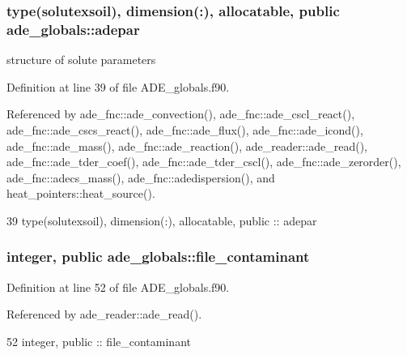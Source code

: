 \subsubsection[{adepar}]{\setlength{\rightskip}{0pt plus 5cm}type({\bf solutexsoil}), dimension(\+:), allocatable, public ade\+\_\+globals\+::adepar}\label{namespaceade__globals_a2034a22816b8b2fa3499cd571f6a097b}


structure of solute parameters 



Definition at line 39 of file A\+D\+E\+\_\+globals.\+f90.



Referenced by ade\+\_\+fnc\+::ade\+\_\+convection(), ade\+\_\+fnc\+::ade\+\_\+cscl\+\_\+react(), ade\+\_\+fnc\+::ade\+\_\+cscs\+\_\+react(), ade\+\_\+fnc\+::ade\+\_\+flux(), ade\+\_\+fnc\+::ade\+\_\+icond(), ade\+\_\+fnc\+::ade\+\_\+mass(), ade\+\_\+fnc\+::ade\+\_\+reaction(), ade\+\_\+reader\+::ade\+\_\+read(), ade\+\_\+fnc\+::ade\+\_\+tder\+\_\+coef(), ade\+\_\+fnc\+::ade\+\_\+tder\+\_\+cscl(), ade\+\_\+fnc\+::ade\+\_\+zerorder(), ade\+\_\+fnc\+::adecs\+\_\+mass(), ade\+\_\+fnc\+::adedispersion(), and heat\+\_\+pointers\+::heat\+\_\+source().


\begin{DoxyCode}
39   \textcolor{keywordtype}{type}(solutexsoil), \textcolor{keywordtype}{dimension(:)}, \textcolor{keywordtype}{allocatable}, \textcolor{keywordtype}{public} :: adepar
\end{DoxyCode}
\subsubsection[{file\+\_\+contaminant}]{\setlength{\rightskip}{0pt plus 5cm}integer, public ade\+\_\+globals\+::file\+\_\+contaminant}\label{namespaceade__globals_a288cade4dba3ff8724e3910ad442d26c}


Definition at line 52 of file A\+D\+E\+\_\+globals.\+f90.



Referenced by ade\+\_\+reader\+::ade\+\_\+read().


\begin{DoxyCode}
52   \textcolor{keywordtype}{integer}, \textcolor{keywordtype}{public} :: file_contaminant
\end{DoxyCode}
